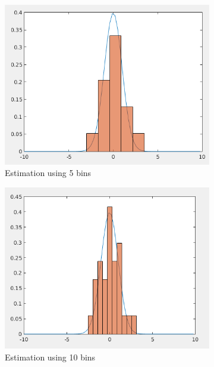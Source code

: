 \documentclass[12pt]{article}
\begin{document}
\begin{itemize}
\begin{figure}
\begin{subfigure}{0.45\textwidth}
\centering
\includegraphics[scale=0.35]{Imgs/5-23.png}
\caption{Estimation using 5 bins}
\end{subfigure}
\begin{subfigure}{0.45\textwidth}
\centering
\includegraphics[scale=0.35]{Imgs/5-24.png}
\caption{Estimation using 10 bins}
\end{subfigure}
\begin{subfigure}{0.45\textwidth}
\centering

\end{subfigure}
\end{figure}
\end{itemize}
\end{document}
